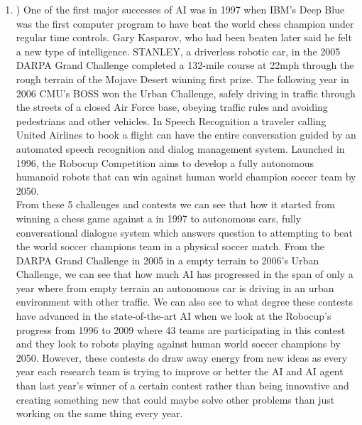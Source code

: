 \documentclass[12pt,letterpaper]{article}
\begin{document}
\begin{enumerate}
    \item ) One of the first major successes of AI was in 1997 when IBM’s Deep Blue was the first computer program to have beat the world chess champion under regular time controls. Gary Kasparov, who had been beaten later said he felt a new type of intelligence. STANLEY, a driverless robotic car, in the 2005 DARPA Grand Challenge completed a 132-mile course at 22mph through the rough terrain of the Mojave Desert winning first prize. The following year in 2006 CMU’s BOSS won the Urban Challenge, safely driving in traffic through the streets of a closed Air Force base, obeying traffic rules and avoiding pedestrians and other vehicles. In Speech Recognition a traveler calling United Airlines to book a flight can have the entire conversation guided by an automated speech recognition and dialog management system. Launched in 1996, the Robocup Competition aims to develop a fully autonomous humanoid robots that can win against human world champion soccer team by 2050. \\
    From these 5 challenges and contests we can see that how it started from winning a chess game against a in 1997 to autonomous cars, fully conversational dialogue system which answers question to attempting to beat the world soccer champions team in a physical soccer match. From the DARPA Grand Challenge in 2005 in a empty terrain to 2006’s Urban Challenge, we can see that how much AI has progressed in the span of only a year where from empty terrain an autonomous car is driving in an urban environment with other traffic. We can also see to what degree these contests have advanced in the state-of-the-art AI when we look at the Robocup’s progress from 1996 to 2009 where 43 teams are participating in this contest and they look to robots playing against human world soccer champions by 2050. However, these contests do draw away energy from new ideas as every year each research team is trying to improve or better the AI and AI agent than last year’s winner of a certain contest rather than being innovative and creating something new that could maybe solve other problems than just working on the same thing every year.


\end{enumerate}
\end{document}
